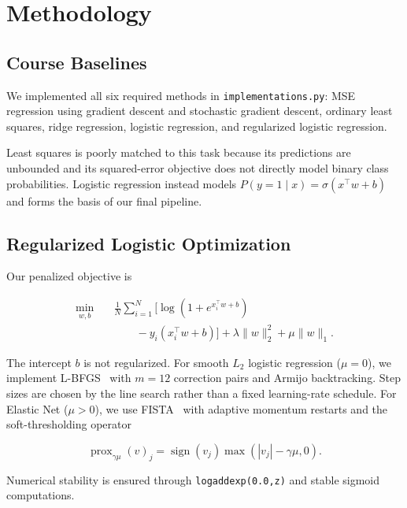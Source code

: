 \documentclass[10pt,conference,compsocconf]{IEEEtran}
\begin{document}
\section{Methodology}

\subsection{Course Baselines}

We implemented all six required methods in \texttt{implementations.py}: MSE
regression using gradient descent and stochastic gradient descent, ordinary
least squares, ridge regression, logistic regression, and regularized logistic
regression.

Least squares is poorly matched to this task because its predictions are
unbounded and its squared-error objective does not directly model binary class
probabilities. Logistic regression instead models
$P(y=1\mid x)=\sigma(x^\top w+b)$ and forms the basis of our final pipeline.

\subsection{Regularized Logistic Optimization}

Our penalized objective is

\begin{equation}
\begin{aligned}
\min_{w,b}\quad
&\frac{1}{N}\sum_{i=1}^{N}
\Big[
\log(1+e^{x_i^\top w+b}) \\
&\qquad - y_i(x_i^\top w+b)
\Big]
+\lambda\|w\|_2^2+\mu\|w\|_1 .
\end{aligned}
\label{eq:objective}
\end{equation}

The intercept $b$ is not regularized. For smooth $L_2$ logistic regression
($\mu=0$), we implement L-BFGS~\cite{nocedal2006} with $m=12$ correction pairs and Armijo
backtracking. Step sizes are chosen by the line search rather than a fixed learning-rate schedule.
For Elastic Net ($\mu>0$), we use FISTA~\cite{beck2009fista} with adaptive momentum restarts and
the soft-thresholding operator

\begin{equation}
\operatorname{prox}_{\gamma\mu}(v)_j
=
\operatorname{sign}(v_j)
\max\!\left(|v_j|-\gamma\mu,0\right).
\end{equation}

Numerical stability is ensured through \texttt{logaddexp(0.0,z)} and stable
sigmoid computations.
\end{document}
